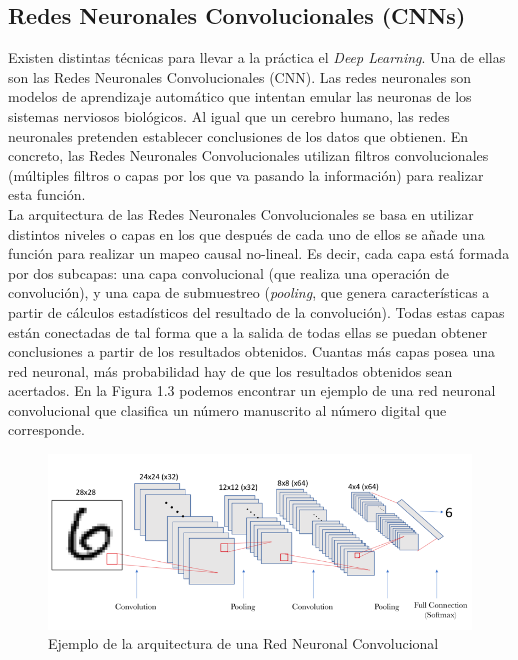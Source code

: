 \documentclass{report}
\begin{document}
\newpage
\subsection{Redes Neuronales Convolucionales (CNNs)}

Existen distintas técnicas para llevar a la práctica el \textit{Deep Learning}. Una de ellas son las Redes Neuronales Convolucionales (CNN). Las redes neuronales son modelos de aprendizaje automático que intentan emular las neuronas de los sistemas nerviosos biológicos. Al igual que un cerebro humano, las redes neuronales pretenden establecer conclusiones de los datos que obtienen. En concreto, las Redes Neuronales Convolucionales utilizan filtros convolucionales (múltiples filtros o capas por los que va pasando la información) para realizar esta función.
\\

La arquitectura de las Redes Neuronales Convolucionales se basa en utilizar distintos niveles o capas en los que después de cada uno de ellos se añade una función para realizar un mapeo causal no-lineal. Es decir, cada capa está formada por dos subcapas: una capa convolucional (que realiza una operación de convolución), y una capa de submuestreo (\textit{pooling}, que genera características a partir de cálculos estadísticos del resultado de la convolución). Todas estas capas están conectadas de  tal forma que a la salida de todas ellas se puedan obtener conclusiones a partir de los resultados obtenidos. Cuantas más capas posea una red neuronal, más probabilidad hay de que los resultados obtenidos sean acertados. En la Figura 1.3 podemos encontrar un ejemplo de una red neuronal convolucional que clasifica un número manuscrito al número digital que corresponde. \cite{Redes neuronales}

\renewcommand{\figurename}{Figura}		
\begin{figure}[h]
	\centering
	 \includegraphics[scale=0.45]{images/ejemplo_cnn.png}
	 \caption{Ejemplo de la arquitectura de una Red Neuronal Convolucional}
\end{figure}
\end{document}

